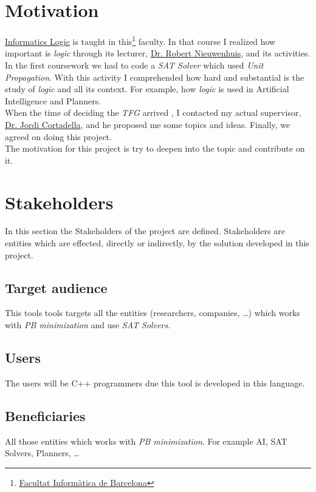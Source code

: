 

\section{Motivation}

\href{https://www.fib.upc.edu/en/studies/bachelors-degrees/bachelor-degree-informatics-engineering/curriculum/syllabus/LI}{Informatics Logic} is taught in this\footnote{\href{https://www.fib.upc.edu/en/}{Facultat Informàtica de Barcelona}} faculty. In that course I realized how important is \emph{logic} through its lecturer, \href{http://www.lsi.upc.es/~roberto/}{Dr. Robert Nieuwenhuis}, and its activities. \\

In the first coursework we had to code a \emph{SAT Solver} which used \emph{Unit Propagation}.
With this activity I comprehended how hard and substantial is the study of \emph{logic} and all its context. For example, how \emph{logic} is used in Artificial Intelligence and Planners.\\

When the time of deciding the \emph{TFG} arrived	, I contacted my actual supervisor, \href{https://www.cs.upc.edu/~jordicf/}{Dr. Jordi Cortadella}, and he proposed me some topics and ideas. Finally, we agreed on doing this project. \\

The motivation for this project is try to deepen into the topic and contribute on it.

\section{Stakeholders}

In this section the Stakeholders of the project are defined. Stakeholders are entities which are effected, directly or indirectly, by the solution developed in this project. 
\subsection{Target audience}
This tools tools targets all the entities (researchers, companies, \ldots) which works with \emph{PB minimization} and use \emph{SAT Solvers}.
\subsection{Users}
The users will be C++ programmers due this tool is developed in this language.
\subsection{Beneficiaries}
All those entities which works with \emph{PB minimization}. For example AI, SAT Solvers, Planners, \ldots


